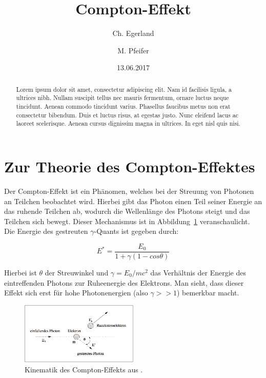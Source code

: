 \documentclass[aps,twocolumn,secnumarabic,nobalancelastpage,amsmath,amssymb,
nofootinbib,superscriptaddress]{revtex4-1}
\begin{document}
\title{Compton-Effekt}
\author         {Ch. Egerland}
\author         {M. Pfeifer}
\date[Versuchsdatum: ]{13.06.2017}

\begin{abstract}
  Lorem ipsum dolor sit amet, consectetur adipiscing elit. Nam id facilisis ligula,
  a ultrices nibh. Nullam suscipit tellus nec mauris fermentum, ornare luctus neque
  tincidunt. Aenean commodo tincidunt varius. Phasellus faucibus metus non erat
  consectetur bibendum. Duis et luctus risus, at egestas justo. Nunc eleifend lacus
  ac laoreet scelerisque. Aenean cursus dignissim magna in ultrices. In eget nisl
  quis nisi.
\end{abstract}


\maketitle



\section{Zur Theorie des Compton-Effektes}
Der Compton-Effekt ist ein Phänomen, welches bei der Streuung von Photonen an
Teilchen beobachtet wird. Hierbei gibt das Photon einen Teil seiner Energie an das
ruhende Teilchen ab, wodurch die Wellenlänge des Photons steigt und das Teilchen
sich bewegt. Dieser Mechanismus ist in Abbildung~\ref{fig:kinematik} veranschaulicht.
Die Energie des gestreuten $\gamma$-Quants ist gegeben durch:

  \begin{equation}
    E^* = \frac{E_0}{1+\gamma(1- cos \theta)}
    \label{eq:streuenergie}
  \end{equation}

Hierbei ist $\theta$ der Streuwinkel und $\gamma = E_0/mc^2$ das Verhältnis der
Energie des eintreffenden Photons zur Ruheenergie des Elektrons. Man sieht, dass
dieser Effekt sich erst für hohe Photonenergien (also $\gamma >> 1$) bemerkbar
macht.

\begin{figure}[h]
  \centering
  \includegraphics[width=0.5\textwidth]{comptstreu_schema.jpeg}
  \caption{\label{fig:kinematik} Kinematik des Compton-Effekts aus \cite{skript07}.}
\end{figure}
\end{document}

